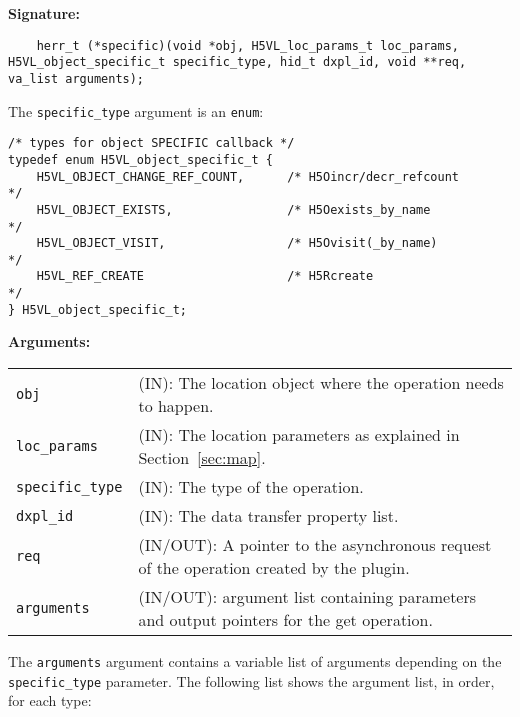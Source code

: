 \begin{mdframed}[style=bgbox]
\textbf{Signature:}
\begin{lstlisting}
	herr_t (*specific)(void *obj, H5VL_loc_params_t loc_params, H5VL_object_specific_t specific_type, hid_t dxpl_id, void **req, va_list arguments);
\end{lstlisting}

The \texttt{specific\_type} argument is an \texttt{enum}:
\begin{lstlisting}
/* types for object SPECIFIC callback */
typedef enum H5VL_object_specific_t {
    H5VL_OBJECT_CHANGE_REF_COUNT,      /* H5Oincr/decr_refcount              */
    H5VL_OBJECT_EXISTS,                /* H5Oexists_by_name                  */
    H5VL_OBJECT_VISIT,                 /* H5Ovisit(_by_name)                 */
    H5VL_REF_CREATE                    /* H5Rcreate                          */
} H5VL_object_specific_t;
\end{lstlisting}

\textbf{Arguments:}\\
\begin{tabular}{l p{13.5cm}}
  \texttt{obj} & (IN): The location object  where the operation needs to happen.\\
  \texttt{loc\_params} & (IN): The location parameters as explained in Section~\ref{sec:map}.\\
  \texttt{specific\_type} & (IN): The type of the operation.\\
  \texttt{dxpl\_id} & (IN): The data transfer property list.\\
  \texttt{req} & (IN/OUT): A pointer to the asynchronous request of the
  operation created by the plugin.\\
  \texttt{arguments} & (IN/OUT): argument list containing parameters and
  output pointers for the get operation. \\
\end{tabular}
\end{mdframed}

The \texttt{arguments} argument contains a variable list of arguments
depending on the \texttt{specific\_type} parameter. The following list shows
the argument list, in order, for each type:

